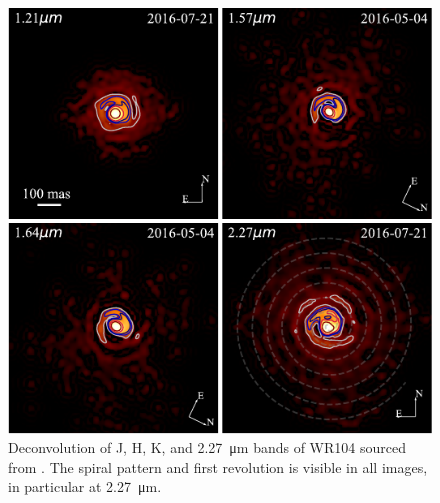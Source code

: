 \begin{figure}[h]
  \centering
  \includegraphics[]{assets/systems/soulain-2018-wr104.pdf}
  \caption[\textit{Spiral structure of WR104 \parencite{soulainSPHEREViewWolfRayet2018}}]{Deconvolution of J, H, K, and \SI{2.27}{\micro\metre} bands of WR104 sourced from \textcite{soulainSPHEREViewWolfRayet2018}. The spiral pattern and first revolution is visible in all images, in particular at \SI{2.27}{\micro\metre}.}
  \label{fig:soulain-wr104}
\end{figure}

